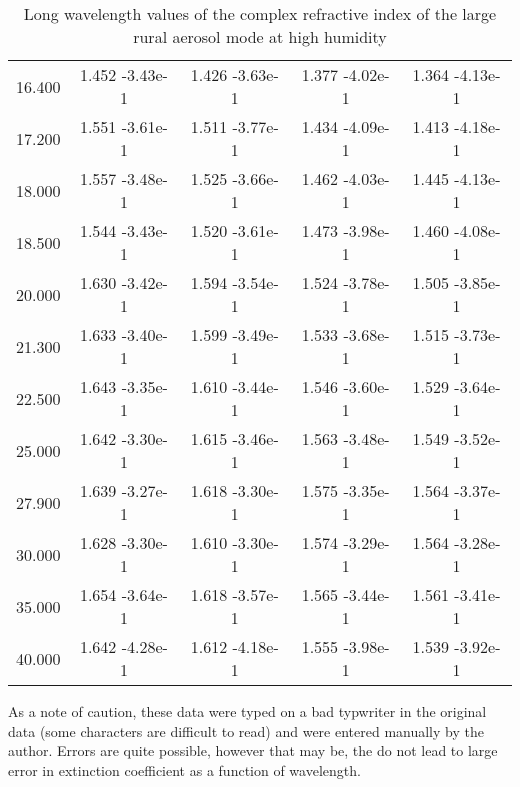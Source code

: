 \documentclass[12pt]{article}
\begin{document}
\begin{center}
\begin{table}
\begin{tabular}{| c | c | c | c | c |  }
16.400  &   1.452   -3.43e-1 &   1.426   -3.63e-1  &  1.377   -4.02e-1  &  1.364   -4.13e-1  \\
17.200  &   1.551   -3.61e-1  &  1.511   -3.77e-1 &   1.434   -4.09e-1 &   1.413   -4.18e-1  \\
18.000  &   1.557   -3.48e-1 &   1.525   -3.66e-1 &   1.462   -4.03e-1 &   1.445   -4.13e-1  \\
18.500  &   1.544   -3.43e-1 &   1.520   -3.61e-1 &   1.473   -3.98e-1 &   1.460   -4.08e-1  \\
20.000  &   1.630   -3.42e-1 &   1.594   -3.54e-1  &  1.524   -3.78e-1 &   1.505   -3.85e-1  \\
21.300  &   1.633   -3.40e-1  &  1.599   -3.49e-1 &   1.533   -3.68e-1 &   1.515   -3.73e-1  \\
22.500  &   1.643   -3.35e-1  &  1.610   -3.44e-1 &   1.546   -3.60e-1  &  1.529   -3.64e-1  \\
25.000  &   1.642   -3.30e-1  &  1.615   -3.46e-1 &   1.563   -3.48e-1  &  1.549   -3.52e-1  \\
27.900  &   1.639   -3.27e-1  &  1.618   -3.30e-1 &   1.575   -3.35e-1  &  1.564   -3.37e-1  \\
30.000  &   1.628   -3.30e-1 &   1.610   -3.30e-1 &   1.574   -3.29e-1  &  1.564   -3.28e-1  \\
35.000  &   1.654   -3.64e-1 &   1.618   -3.57e-1  &  1.565   -3.44e-1  &  1.561   -3.41e-1  \\
40.000  &   1.642   -4.28e-1 &   1.612   -4.18e-1  &  1.555   -3.98e-1  &  1.539   -3.92e-1 \\
\hline
\end{tabular}
\caption{Long wavelength values of the complex refractive index of the large rural aerosol mode at high humidity}
\end{table}
\end{center}

As a note of caution, these data were typed on a bad typwriter in the original data (some characters are difficult
to read) and were entered manually by the author. Errors are quite possible, however that may be, the do not lead to
large error in extinction coefficient as a function of wavelength.



\end{document}
